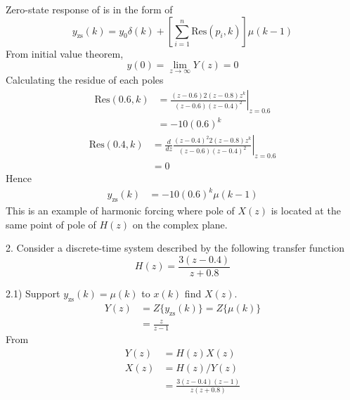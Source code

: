 \documentclass[12pt]{article}
\begin{document}
Zero-state response of is in the form of
\begin{equation*}
    y_\text{zs}(k) = y_0\delta(k) + [\sum_{i=1}^n \text{Res}(p_i, k)]\mu(k-1)    
\end{equation*}
From initial value theorem,
\begin{equation*}
    y(0) = \lim_{z\rightarrow\infty}Y(z) = 0
\end{equation*}
Calculating the residue of each poles
\begin{equation*}
\begin{split}
    \text{Res}(0.6, k) &= \left.\frac{(z-0.6)2(z-0.8)z^k}{(z-0.6)(z-0.4)^2}\right|_{z=0.6} \\
    &= -10(0.6)^k
\end{split}
\end{equation*}
\begin{equation*}
\begin{split}
    \text{Res}(0.4, k) &= \left.\frac{d}{dz}\frac{(z-0.4)^2 2(z-0.8)z^k}{(z-0.6)(z-0.4)^2}\right|_{z=0.6} \\
    &= 0
\end{split}
\end{equation*}
Hence
\begin{equation*}
\begin{split}
    y_\text{zs} (k) &= -10(0.6)^k\mu(k-1)
\end{split}
\end{equation*}
This is an example of harmonic forcing where pole of $X(z)$ is located
at the same point of pole of $H(z)$ on the complex plane.

\vspace{20pt}
2. Consider a discrete-time system described by the following transfer function
\begin{equation*}
    H(z) = \frac{3(z-0.4)}{z+0.8}
\end{equation*}

2.1) Support $y_\text{zs}(k) = \mu(k)$ to $x(k)$ find $X(z)$.
\begin{equation*}
    \begin{split}
        Y(z) &= Z\{y_\text{zs}(k)\} = Z\{\mu(k)\} \\
        &= \frac{z}{z-1}
    \end{split}
\end{equation*}
From 
\begin{equation*}
    \begin{split}
        Y(z) &= H(z)X(z) \\
        X(z) &= H(z)/Y(z) \\
        &= \frac{3(z-0.4)(z-1)}{z(z+0.8)}
    \end{split}
\end{equation*}
\end{document}
